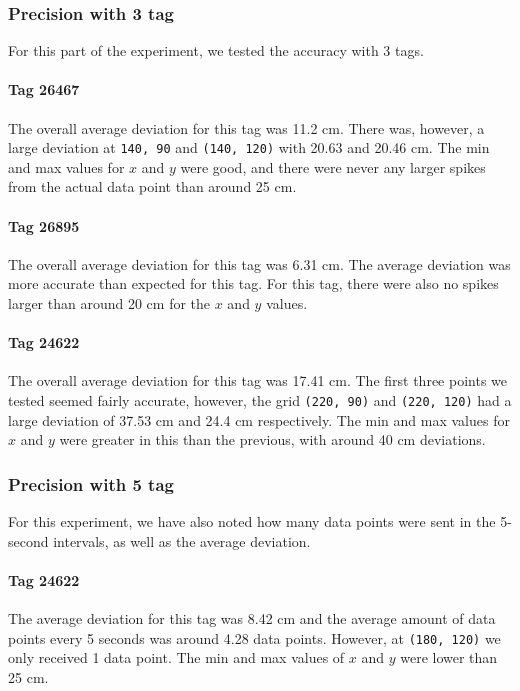 \subsubsection{Precision with 3 tag}
For this part of the experiment, we tested the accuracy with 3 tags. 

\paragraph{Tag 26467}
The overall average deviation for this tag was 11.2 cm.
There was, however, a large deviation at \texttt{140, 90} and \texttt{(140, 120)} with 20.63 and 20.46 cm.
The min and max values for $x$ and $y$ were good, and there were never any larger spikes from the actual data point than around 25 cm.

\paragraph{Tag 26895}
The overall average deviation for this tag was 6.31 cm.
The average deviation was more accurate than expected for this tag.
For this tag, there were also no spikes larger than around 20 cm for the $x$ and $y$ values.

\paragraph{Tag 24622}
The overall average deviation for this tag was 17.41 cm.
The first three points we tested seemed fairly accurate, however, the grid \texttt{(220, 90)} and \texttt{(220, 120)} had a large deviation of 37.53 cm and 24.4 cm respectively.
The min and max values for $x$ and $y$ were greater in this than the previous, with around 40 cm deviations.

\subsubsection{Precision with 5 tag}
For this experiment, we have also noted how many data points were sent in the 5-second intervals, as well as the average deviation.

\paragraph{Tag 24622}
The average deviation for this tag was 8.42 cm and the average amount of data points every 5 seconds was around 4.28 data points.
However, at \texttt{(180, 120)} we only received 1 data point.
The min and max values of $x$ and $y$ were lower than 25 cm.

